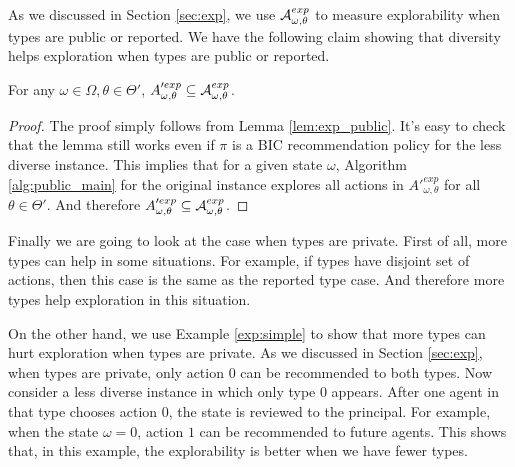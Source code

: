 As we discussed in Section \ref{sec:exp}, we use $\mathcal{A}^{exp}_{\omega,\theta}$ to measure explorability when types are public or reported. We have the following claim showing that diversity helps exploration when types are public or reported.

\begin{claim}
For any $\omega \in \varOmega, \theta \in \varTheta'$, $A'^{exp}_{\omega,\theta} \subseteq \mathcal{A}^{exp}_{\omega,\theta}$. 
\end{claim}

\begin{proof}
The proof simply follows from Lemma \ref{lem:exp_public}. It's easy to check that the lemma still works even if $\pi$ is a BIC recommendation policy for the less diverse instance. This implies that for a given state $\omega$, Algorithm \ref{alg:public_main} for the original instance explores all actions in $A'^{exp}_{\omega,\theta}$ for all $\theta \in \varTheta'$. And therefore $A'^{exp}_{\omega,\theta} \subseteq \mathcal{A}^{exp}_{\omega,\theta}$.
\end{proof}

Finally we are going to look at the case when types are private. First of all, more types can help in some situations. For example, if types have disjoint set of actions, then this case is the same as the reported type case. And therefore more types help exploration in this situation. 

On the other hand, we use Example \ref{exp:simple} to show that more types can hurt exploration when types are private. As we discussed in Section \ref{sec:exp}, when types are private, only action 0 can be recommended to both types. Now consider a less diverse instance in which only type 0 appears. After one agent in that type chooses action 0, the state is reviewed to the principal. For example, when the state $\omega = 0$, action $1$ can be recommended to future agents. This shows that,  in this example, the explorability is better when we have fewer types. 